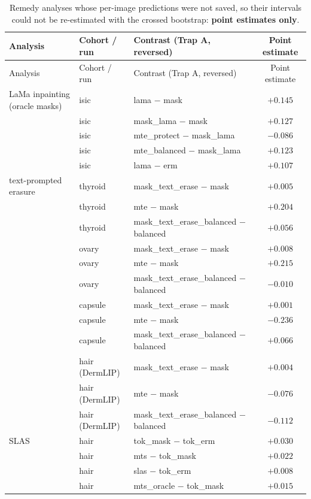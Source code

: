 {\scriptsize
\begin{longtable}{p{4.0cm}p{3.6cm}p{5.2cm}c}
\caption{Remedy analyses whose per-image predictions were not saved, so their intervals could not be re-estimated with the crossed bootstrap: \textbf{point estimates only}.}\label{tab:archived}\\\toprule
Analysis & Cohort / run & Contrast (Trap A, reversed) & Point estimate \\\midrule
\endfirsthead
\toprule Analysis & Cohort / run & Contrast (Trap A, reversed) & Point estimate \\\midrule
\endhead
\bottomrule
\endlastfoot
LaMa inpainting (oracle masks) & isic & lama $-$ mask & $+0.145$ \\
 & isic & mask\_lama $-$ mask & $+0.127$ \\
 & isic & mte\_protect $-$ mask\_lama & $-0.086$ \\
 & isic & mte\_balanced $-$ mask\_lama & $+0.123$ \\
 & isic & lama $-$ erm & $+0.107$ \\
text-prompted erasure & thyroid & mask\_text\_erase $-$ mask & $+0.005$ \\
 & thyroid & mte $-$ mask & $+0.204$ \\
 & thyroid & mask\_text\_erase\_balanced $-$ balanced & $+0.056$ \\
 & ovary & mask\_text\_erase $-$ mask & $+0.008$ \\
 & ovary & mte $-$ mask & $+0.215$ \\
 & ovary & mask\_text\_erase\_balanced $-$ balanced & $-0.010$ \\
 & capsule & mask\_text\_erase $-$ mask & $+0.001$ \\
 & capsule & mte $-$ mask & $-0.236$ \\
 & capsule & mask\_text\_erase\_balanced $-$ balanced & $+0.066$ \\
 & hair (DermLIP) & mask\_text\_erase $-$ mask & $+0.004$ \\
 & hair (DermLIP) & mte $-$ mask & $-0.076$ \\
 & hair (DermLIP) & mask\_text\_erase\_balanced $-$ balanced & $-0.112$ \\
SLAS & hair & tok\_mask $-$ tok\_erm & $+0.030$ \\
 & hair & mts $-$ tok\_mask & $+0.022$ \\
 & hair & slas $-$ tok\_erm & $+0.008$ \\
 & hair & mts\_oracle $-$ tok\_mask & $+0.015$ \\

\end{longtable}}
